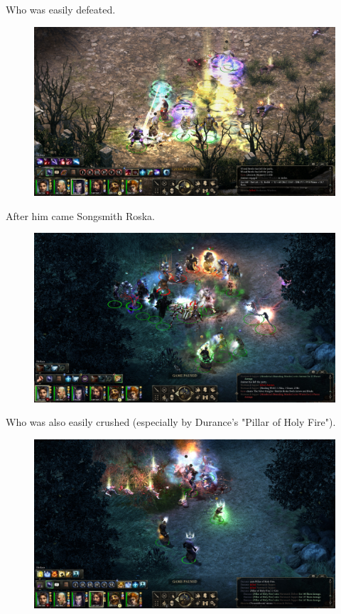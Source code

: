\documentclass{article}
\begin{document}
Who was easily defeated.

\begin{figure}
\includegraphics[scale=0.33]{files/blog/2019_03_04_pillars_of_eternity_path_of_the_damned_act_iii/2019_03_04_thorfen2.jpg}
\end{figure}

After him came Songsmith Roska.

\begin{figure}
\includegraphics[scale=0.33]{files/blog/2019_03_04_pillars_of_eternity_path_of_the_damned_act_iii/2019_03_04_roska1.jpg}
\end{figure}

Who was also easily crushed (especially by Durance's "Pillar of Holy Fire").

\begin{figure}
\includegraphics[scale=0.33]{files/blog/2019_03_04_pillars_of_eternity_path_of_the_damned_act_iii/2019_03_04_roska2.jpg}
\end{figure}
\end{document}
